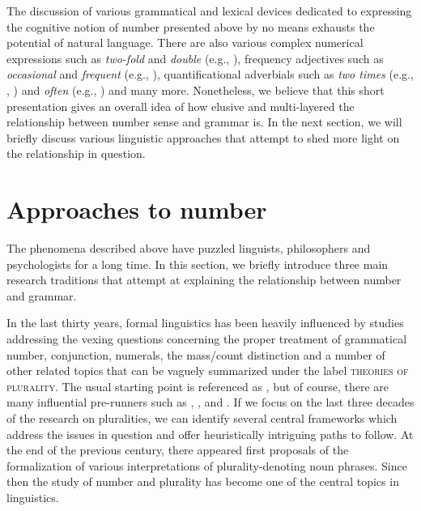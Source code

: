 \documentclass[output=paper]{langscibook}
\begin{document}
\noindent The discussion of various grammatical and lexical devices dedicated to expressing the cognitive notion of number presented above by no means exhausts the potential of natural language. There are also various complex numerical expressions such as \textit{two-fold} and \textit{double} (e.g., \citealt{wagiel2018subatomic}), frequency adjectives such as \textit{occasional} and \textit{frequent} (e.g., \citealt{gehrke_mcnally2015distributional}), quantificational adverbials such as \textit{two times} (e.g., \citealt[Ch.~11]{landman2004indefinites}, \citealt{docekal_wagiel2018event}) and \textit{often} (e.g., \citealt{doetjes2007adverbs}) and many more. Nonetheless, we believe that this short presentation gives an overall idea of how elusive and multi-layered the relationship between number sense and grammar is. In the next section, we will briefly discuss various linguistic approaches that attempt to shed more light on the relationship in question.

\section{Approaches to number}\label{doc-wag:sec:approaches-to-number}

The phenomena described above have puzzled linguists, philosophers and psychologists for a long time. In this section, we briefly introduce three main research traditions that attempt at explaining the relationship between number and grammar. 

In the last thirty years, formal linguistics has been heavily influenced by studies addressing the vexing questions concerning the proper treatment of grammatical number, conjunction, numerals, the mass/count distinction and a number of other related topics that can be vaguely summarized under the label \textsc{theories of plurality}. The usual starting point is referenced as \citet{link1983logical}, but of course, there are many influential pre-runners such as \citet{bennett1979mass}, \citet{ter_meulen1980substances}, and \citet{scha1981distributive}. If we focus on the last three decades of the research on pluralities, we can identify several central frameworks which address the issues in question and offer heuristically intriguing paths to follow. At the end of the previous century, there appeared first proposals of the formalization of various interpretations of plurality-denoting noun phrases. Since then the study of number and plurality has become one of the central topics in linguistics.
\end{document}
